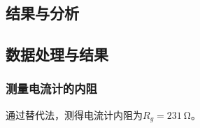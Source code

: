 \documentclass[]{../../templates/Report}
\begin{document}
\begin{fullreportonly}

\section{结果与分析}
\subsection{数据处理与结果}
\subsubsection{测量电流计的内阻}
通过替代法，测得电流计内阻为$R_g = \SI{231}{\ohm}$。

\end{fullreportonly}
\end{document}

